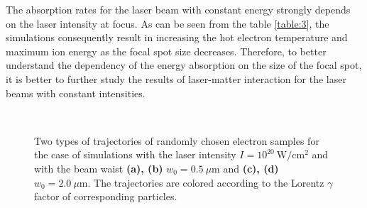 The absorption rates for the laser beam with constant energy strongly depends on the laser intensity at focus. As can be seen from the table \ref{table:3}, the simulations consequently result in increasing the hot electron temperature and maximum ion energy as the focal spot size decreases. Therefore, to better understand the dependency of the energy absorption on the size of the focal spot, it is better to further study the results of laser-matter interaction for the laser beams with constant intensities.

\begin{figure}[h!]
	\centering
	\\[2mm]
	\caption{Two types of trajectories of randomly chosen electron samples for the case of simulations with the laser intensity $ I = 10^{20} \ \mathrm{W/cm^2} $ and with the beam waist \textbf{(a), (b)} $ w_0 = 0.5 \ \mu\mathrm{m} $ and \textbf{(c), (d)} $ w_0 = 2.0 \ \mu\mathrm{m} $. The trajectories are colored according to the Lorentz $ \gamma $ factor of corresponding particles.}
	\label{fig:19}
\end{figure}

